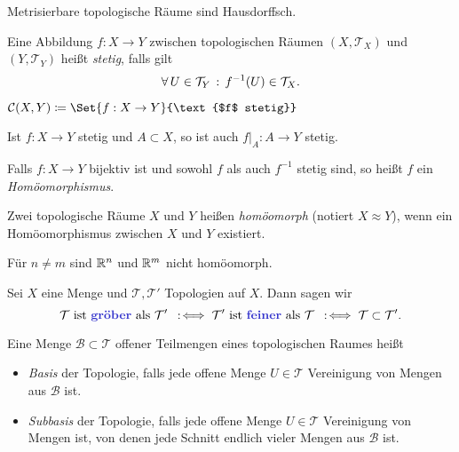 \documentclass{cheat-sheet}
\newcommand{\Tau}{\mathcal{T}} %
\begin{document}
\begin{prop}
  Metrisierbare topologische Räume sind Hausdorffsch.
\end{prop}

\begin{defn}
  Eine Abbildung $f : X \to Y$ zwischen topologischen Räumen $(X, \Tau_X)$ und $(Y, \Tau_Y)$ heißt \emph{stetig}, falls gilt
  \[ \fa{U \in \Tau_Y} f^{-1}(U) \in \Tau_X. \]
\end{defn}

\begin{nota}
  $\mathcal{C}(X, Y) \coloneqq \Set{ f : X \to Y }{\text{$f$ stetig}}$
\end{nota}

\begin{bem}
  Ist $f : X \to Y$ stetig und $A \subset X$, so ist auch $f|_A : A \to Y$ stetig.
\end{bem}

\begin{defn}
  Falls $f : X \to Y$ bijektiv ist und sowohl $f$ als auch $f^{-1}$ stetig sind, so heißt $f$ ein \emph{Homöomorphismus}.
\end{defn}

\begin{defn}
  Zwei topologische Räume $X$ und $Y$ heißen \emph{homöomorph} (notiert $X \approx Y$), wenn ein Homöomorphismus zwischen $X$ und $Y$ existiert.
\end{defn}

\begin{satz}
  Für $n \not= m$ sind $\mathbb{R}^n$ und $\mathbb{R}^m$ nicht homöomorph.
\end{satz}

\begin{defn}
  Sei $X$ eine Menge und $\Tau, \Tau'$ Topologien auf $X$. Dann sagen wir
  \[ \Tau \text{ ist \emph{gröber} als } \Tau' \coloniff \Tau' \text{ ist \emph{feiner} als } \Tau \coloniff \Tau \subset \Tau'. \]
\end{defn}


\begin{defn}
  Eine Menge $\mathcal{B} \subset \Tau$ offener Teilmengen eines topologischen Raumes heißt
  \begin{itemize}
    \item \emph{Basis} der Topologie, falls jede offene Menge $U \in \Tau$ Vereinigung von Mengen aus $\mathcal{B}$ ist.
    \item \emph{Subbasis} der Topologie, falls jede offene Menge $U \in \Tau$ Vereinigung von Mengen ist, von denen jede Schnitt endlich vieler Mengen aus $\mathcal{B}$ ist.
  \end{itemize}
\end{defn}
\end{document}
